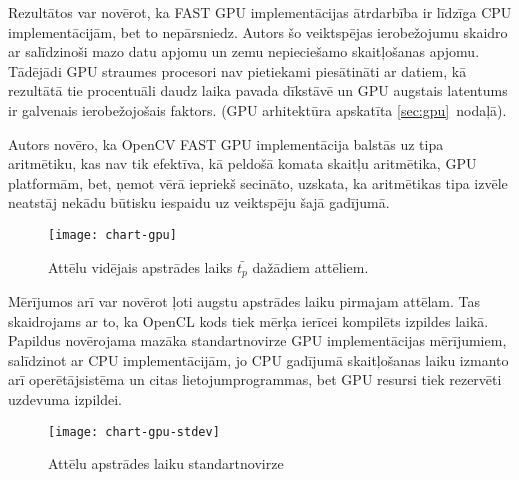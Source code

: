 Rezultātos var novērot, ka FAST GPU implementācijas ātrdarbība ir līdzīga
CPU implementācijām, bet to nepārsniedz. Autors šo veiktspējas
ierobežojumu skaidro ar salīdzinoši mazo datu apjomu un
zemu nepieciešamo skaitļošanas apjomu. Tādējādi GPU straumes
procesori nav pietiekami piesātināti ar datiem, kā rezultātā tie
procentuāli daudz laika pavada dīkstāvē un
GPU augstais latentums ir galvenais ierobežojošais faktors.
(GPU arhitektūra apskatīta \ref{sec:gpu}~nodaļā).

Autors novēro, ka OpenCV FAST GPU implementācija balstās uz
 tipa aritmētiku, kas nav tik efektīva, kā
peldošā komata skaitļu aritmētika, GPU platformām, bet, ņemot vērā
iepriekš secināto, uzskata, ka aritmētikas tipa izvēle neatstāj nekādu
būtisku iespaidu uz veiktspēju šajā gadījumā.

\begin{figure}[t]
	\centering
	\texttt{[image: chart-gpu]}
	\caption{Attēlu vidējais apstrādes laiks $\bar{t_p}$ dažādiem attēliem.}
	\label{fig:test2-data}
\end{figure}
Mērījumos arī var novērot ļoti augstu apstrādes laiku pirmajam attēlam. Tas
skaidrojams ar to, ka OpenCL kods tiek mērķa ierīcei kompilēts izpildes
laikā. 
Papildus novērojama mazāka standartnovirze GPU implementācijas mērījumiem,
salīdzinot ar CPU implementācijām, jo CPU gadījumā skaitļošanas laiku
izmanto arī operētājsistēma un citas lietojumprogrammas, bet GPU resursi
tiek rezervēti uzdevuma izpildei.
\begin{figure}[bh]
	\centering
	\texttt{[image: chart-gpu-stdev]}
	\caption{Attēlu apstrādes laiku standartnovirze}
	\label{fig:test2-stdev}
\end{figure}
